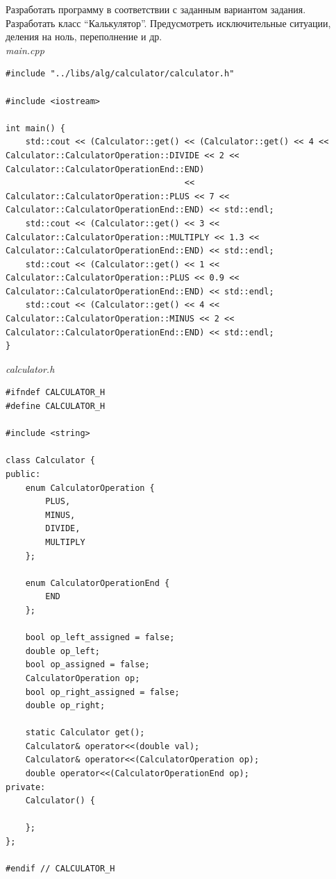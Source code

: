 \documentclass[a4paper,14pt]{extarticle}
\begin{document}
Разработать программу в соответствии с заданным вариантом задания.\bigbreak
Разработать класс “Калькулятор”. Предусмотреть исключительные ситуации,
деления на ноль, переполнение и др.\\
\textit{main.cpp}
\begin{verbatim}
#include "../libs/alg/calculator/calculator.h"

#include <iostream>

int main() {
    std::cout << (Calculator::get() << (Calculator::get() << 4 << Calculator::CalculatorOperation::DIVIDE << 2 << Calculator::CalculatorOperationEnd::END)
                                    << Calculator::CalculatorOperation::PLUS << 7 << Calculator::CalculatorOperationEnd::END) << std::endl;
    std::cout << (Calculator::get() << 3 << Calculator::CalculatorOperation::MULTIPLY << 1.3 << Calculator::CalculatorOperationEnd::END) << std::endl;
    std::cout << (Calculator::get() << 1 << Calculator::CalculatorOperation::PLUS << 0.9 << Calculator::CalculatorOperationEnd::END) << std::endl;
    std::cout << (Calculator::get() << 4 << Calculator::CalculatorOperation::MINUS << 2 << Calculator::CalculatorOperationEnd::END) << std::endl;
}
\end{verbatim}

\textit{calculator.h}
\begin{verbatim}
#ifndef CALCULATOR_H
#define CALCULATOR_H

#include <string>

class Calculator {
public:
    enum CalculatorOperation {
        PLUS,
        MINUS,
        DIVIDE,
        MULTIPLY
    };

    enum CalculatorOperationEnd {
        END
    };

    bool op_left_assigned = false;
    double op_left;
    bool op_assigned = false;
    CalculatorOperation op;
    bool op_right_assigned = false;
    double op_right;

    static Calculator get();
    Calculator& operator<<(double val);
    Calculator& operator<<(CalculatorOperation op);
    double operator<<(CalculatorOperationEnd op);
private:
    Calculator() {

    };
};

#endif // CALCULATOR_H    
\end{verbatim}
\end{document}

